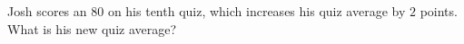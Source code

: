 Josh scores an $80$ on his tenth quiz, which increases his quiz average by $2$ points. What is his new quiz average?
